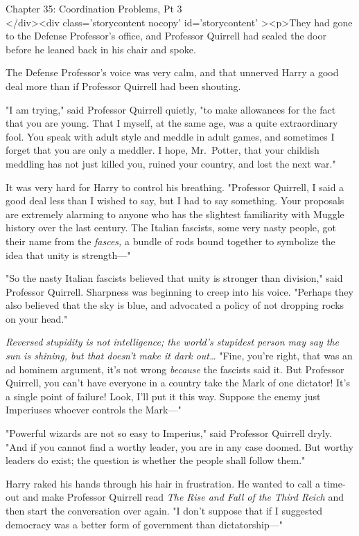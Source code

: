
Chapter 35: Coordination Problems, Pt 3\\
</div><div  class='storycontent nocopy' id='storycontent' ><p>They had gone to 
the Defense Professor's office, and Professor Quirrell had sealed the door 
before he leaned back in his chair and spoke.

The Defense Professor's voice was very calm, and that unnerved Harry a good 
deal more than if Professor Quirrell had been shouting.

"I am trying," said Professor Quirrell quietly, "to make allowances for the 
fact that you are young. That I myself, at the same age, was a quite 
extraordinary fool. You speak with adult style and meddle in adult games, and 
sometimes I forget that you are only a meddler. I hope, Mr.~Potter, that your 
childish meddling has not just killed you, ruined your country, and lost the 
next war."

It was very hard for Harry to control his breathing. "Professor Quirrell, I 
said a good deal less than I wished to say, but I had to say something. Your 
proposals are extremely alarming to anyone who has the slightest familiarity 
with Muggle history over the last century. The Italian fascists, some very 
nasty people, got their name from the \emph{fasces,} a bundle of rods bound 
together to symbolize the idea that unity is strength---"

"So the nasty Italian fascists believed that unity is stronger than division," 
said Professor Quirrell. Sharpness was beginning to creep into his voice. 
"Perhaps they also believed that the sky is blue, and advocated a policy of not 
dropping rocks on your head."

\emph{Reversed stupidity is not intelligence; the world's stupidest person may 
say the sun is shining, but that doesn't make it dark out{\ldots}} "Fine, 
you're right, that was an ad hominem argument, it's not wrong \emph{because} 
the fascists said it. But Professor Quirrell, you can't have everyone in a 
country take the Mark of one dictator! It's a single point of failure! Look, 
I'll put it this way. Suppose the enemy just Imperiuses whoever controls the 
Mark---"

"Powerful wizards are not so easy to Imperius," said Professor Quirrell dryly. 
"And if you cannot find a worthy leader, you are in any case doomed. But worthy 
leaders do exist; the question is whether the people shall follow them."

Harry raked his hands through his hair in frustration. He wanted to call a 
time-out and make Professor Quirrell read \emph{The Rise and Fall of the Third 
Reich} and then start the conversation over again. "I don't suppose that if I 
suggested democracy was a better form of government than dictatorship---"

